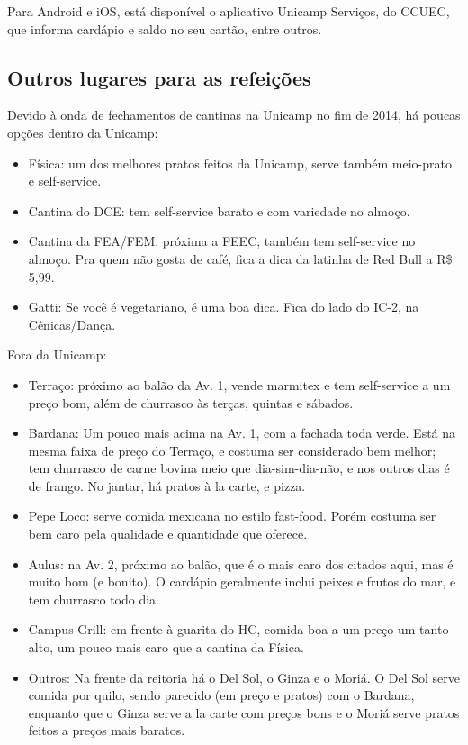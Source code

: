 Para Android e iOS, está disponível o aplicativo Unicamp Serviços, do CCUEC, que
informa cardápio e saldo no seu cartão, entre outros.

\subsection{Outros lugares para as refeições}

Devido à onda de fechamentos de cantinas na Unicamp no fim de 2014, há poucas
opções dentro da Unicamp:

\begin{itemize}
\item Física: um dos melhores pratos feitos da Unicamp, serve também meio-prato
  e self-service.
\item Cantina do DCE: tem self-service barato e com variedade no almoço.
\item Cantina da FEA/FEM: próxima a FEEC, também tem self-service no almoço. Pra
  quem não gosta de café, fica a dica da latinha de Red Bull a R\$ 5,99.
\item Gatti: Se você é vegetariano, é uma boa dica. Fica do lado do IC-2, na
  Cênicas/Dança.
\end {itemize}

Fora da Unicamp:

\begin{itemize}
\item Terraço: próximo ao balão da Av. 1, vende marmitex e tem self-service a um
  preço bom, além de churrasco às terças, quintas e sábados.
\item Bardana: Um pouco mais acima na Av. 1, com a fachada toda verde. Está na
  mesma faixa de preço do Terraço, e costuma ser considerado bem melhor; tem
  churrasco de carne bovina meio que dia-sim-dia-não, e nos outros dias é de
  frango. No jantar, há pratos à la carte, e pizza.
\item Pepe Loco: serve comida mexicana no estilo fast-food. Porém costuma ser
  bem caro pela qualidade e quantidade que oferece.
\item Aulus: na Av. 2, próximo ao balão, que é o mais caro dos citados aqui, mas
  é muito bom (e bonito). O cardápio geralmente inclui peixes e frutos do mar, e
  tem churrasco todo dia.
\item Campus Grill: em frente à guarita do HC, comida boa a um preço um tanto
  alto, um pouco mais caro que a cantina da Física.
\item Outros: Na frente da reitoria há o Del Sol, o Ginza e o Moriá.  O Del Sol
  serve comida por quilo, sendo parecido (em preço e pratos) com o Bardana,
  enquanto que o Ginza serve a la carte com preços bons e o Moriá serve pratos
  feitos a preços mais baratos. 
\end{itemize}

